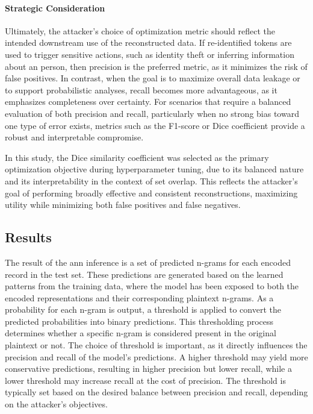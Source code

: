 \paragraph{Strategic Consideration}

Ultimately, the attacker’s choice of optimization metric should reflect the intended downstream use of the reconstructed data.
If re-identified tokens are used to trigger sensitive actions, such as identity theft or inferring information about an person, then precision is the preferred metric, as it minimizes the risk of false positives.
In contrast, when the goal is to maximize overall data leakage or to support probabilistic analyses, recall becomes more advantageous, as it emphasizes completeness over certainty.
For scenarios that require a balanced evaluation of both precision and recall, particularly when no strong bias toward one type of error exists, metrics such as the F1-score or Dice coefficient provide a robust and interpretable compromise.

In this study, the Dice similarity coefficient was selected as the primary optimization objective during hyperparameter tuning, due to its balanced nature and its interpretability in the context of set overlap.
This reflects the attacker’s goal of performing broadly effective and consistent reconstructions, maximizing utility while minimizing both false positives and false negatives.


\subsection{Results}

The result of the \ac{ann} inference is a set of predicted n-grams for each encoded record in the test set.
These predictions are generated based on the learned patterns from the training data, where the model has been exposed to both the encoded representations and their corresponding plaintext n-grams.
As a probability for each n-gram is output, a threshold is applied to convert the predicted probabilities into binary predictions.
This thresholding process determines whether a specific n-gram is considered present in the original plaintext or not.
The choice of threshold is important, as it directly influences the precision and recall of the model's predictions.
A higher threshold may yield more conservative predictions, resulting in higher precision but lower recall, while a lower threshold may increase recall at the cost of precision.
The threshold is typically set based on the desired balance between precision and recall, depending on the attacker's objectives.

